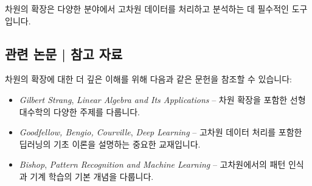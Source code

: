 \vspace{1\baselineskip}
\noindent 차원의 확장은 다양한 분야에서 고차원 데이터를 처리하고 분석하는 데 필수적인 도구입니다.

\subsection{관련 논문 | 참고 자료}
차원의 확장에 대한 더 깊은 이해를 위해 다음과 같은 문헌을 참조할 수 있습니다:

\begin{itemize}
  \item \textit{Gilbert Strang}, \textit{Linear Algebra and Its Applications} – 차원 확장을 포함한 선형대수학의 다양한 주제를 다룹니다.
  \item \textit{Goodfellow, Bengio, Courville}, \textit{Deep Learning} – 고차원 데이터 처리를 포함한 딥러닝의 기초 이론을 설명하는 중요한 교재입니다.
  \item \textit{Bishop}, \textit{Pattern Recognition and Machine Learning} – 고차원에서의 패턴 인식과 기계 학습의 기본 개념을 다룹니다.
\end{itemize}
